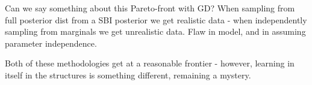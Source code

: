 \documentclass[mphil,deptreport,ai]{infthesis} %
\begin{document}
Can we say something about this Pareto-front with GD?
When sampling from full posterior dist from a SBI posterior we get realistic data - when independently sampling from marginals we get unrealistic data. Flaw in model, and in assuming parameter independence.

Both of these methodologies get at a reasonable frontier - however, learning in itself in the structures is something different, remaining a mystery.







% 
% 
% 
\end{document}
